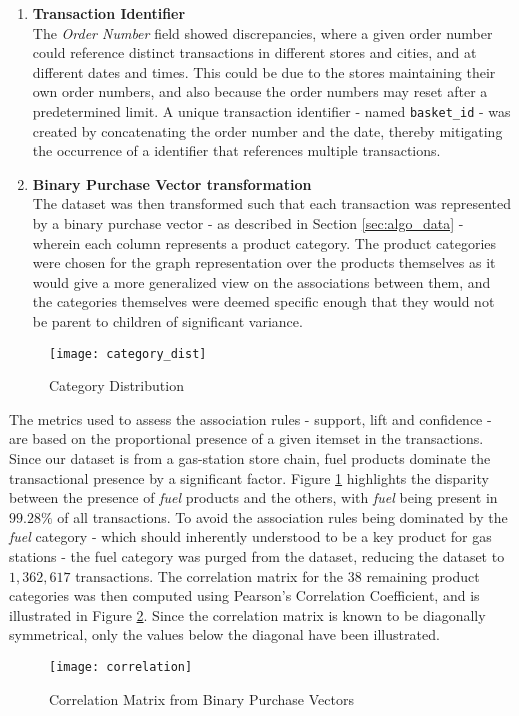 \begin{enumerate}
\item \textbf{Transaction Identifier}\\
The \textit{Order Number} field showed discrepancies, where a given order number could reference distinct transactions in different stores and cities, and at different dates and times. 
This could be due to the stores maintaining their own order numbers, and also because the order numbers may reset after a predetermined limit.
A unique transaction identifier - named \texttt{basket\_id} - was created by concatenating the order number and the date, thereby mitigating the occurrence of a identifier that references multiple transactions.

\item \textbf{Binary Purchase Vector transformation}\\
The dataset was then transformed such that each transaction was represented by a binary purchase vector - as described in Section \ref{sec:algo_data} - wherein each column represents a product category. The product categories were chosen for the graph representation over the products themselves as it would give a more generalized view on the associations between them, and the categories themselves were deemed specific enough that they would not be parent to children of significant variance.
\end{enumerate} 
\begin{figure}[H]
\centering
\texttt{[image: category\_dist]}
\caption{Category Distribution}
\label{fig:cat_dist}
\end{figure}
The metrics used to assess the association rules - support, lift and confidence - are based on the proportional presence of a given itemset in the transactions. Since our dataset is from a gas-station store chain, fuel products dominate the transactional presence by a significant factor. Figure \ref{fig:cat_dist} highlights the disparity between the presence of \textit{fuel} products and the others, with \textit{fuel} being present in $99.28\%$ of all transactions. To avoid the association rules being dominated by the \textit{fuel} category - which should inherently understood to be a key product for gas stations - the fuel category was purged from the dataset, reducing the dataset to $1,362,617$ transactions.
The correlation matrix for the $38$ remaining product categories was then computed using Pearson's Correlation Coefficient, and is illustrated in Figure \ref{fig:correlation}. Since the correlation matrix is known to be diagonally symmetrical, only the values below the diagonal have been illustrated.
\begin{figure}[H]
\centering
\texttt{[image: correlation]}
\caption{Correlation Matrix from Binary Purchase Vectors}
\label{fig:correlation}
\end{figure}


